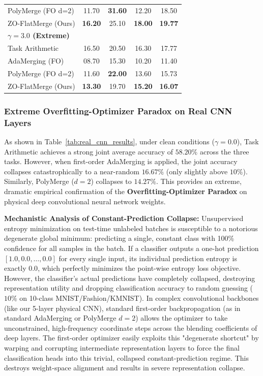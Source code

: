\begin{table}[h]
\begin{center}
\begin{small}
\begin{sc}
\begin{tabular}{lcccc}
PolyMerge (FO d=2) & 11.70 & \textbf{31.60} & 12.20 & 18.50 \\
ZO-FlatMerge (Ours) & \textbf{16.20} & 25.10 & \textbf{18.00} & \textbf{19.77} \\
\midrule
\textbf{$\gamma = 3.0$ (Extreme)} & & & & \\
Task Arithmetic & 16.50 & 20.50 & 16.30 & 17.77 \\
AdaMerging (FO) & 08.70 & 15.30 & 10.20 & 11.40 \\
PolyMerge (FO d=2) & 11.60 & \textbf{22.00} & 13.60 & 15.73 \\
ZO-FlatMerge (Ours) & \textbf{13.30} & 19.70 & \textbf{15.20} & \textbf{16.07} \\
\bottomrule
\end{tabular}
\end{sc}
\end{small}
\end{center}
\vskip -0.1in
\end{table}

\subsubsection{Extreme Overfitting-Optimizer Paradox on Real CNN Layers}
As shown in Table~\ref{tab:real_cnn_results}, under clean conditions ($\gamma=0.0$), Task Arithmetic achieves a strong joint average accuracy of $58.20\%$ across the three tasks.
However, when first-order AdaMerging is applied, the joint accuracy collapses catastrophically to a near-random $16.67\%$ (only slightly above $10\%$).
Similarly, PolyMerge ($d=2$) collapses to $14.27\%$.
This provides an extreme, dramatic empirical confirmation of the \textbf{Overfitting-Optimizer Paradox} on physical deep convolutional neural network weights.

\textbf{Mechanistic Analysis of Constant-Prediction Collapse:}
Unsupervised entropy minimization on test-time unlabeled batches is susceptible to a notorious degenerate global minimum: predicting a single, constant class with 100\% confidence for all samples in the batch. 
If a classifier outputs a one-hot prediction $[1.0, 0.0, \dots, 0.0]$ for every single input, its individual prediction entropy is exactly $0.0$, which perfectly minimizes the point-wise entropy loss objective. However, the classifier's actual predictions have completely collapsed, destroying representation utility and dropping classification accuracy to random guessing ($10\%$ on 10-class MNIST/Fashion/KMNIST).
In complex convolutional backbones (like our 5-layer physical CNN), standard first-order backpropagation (as in standard AdaMerging or PolyMerge $d=2$) allows the optimizer to take unconstrained, high-frequency coordinate steps across the blending coefficients of deep layers. 
The first-order optimizer easily exploits this "degenerate shortcut" by warping and corrupting intermediate representation layers to force the final classification heads into this trivial, collapsed constant-prediction regime. This destroys weight-space alignment and results in severe representation collapse.

